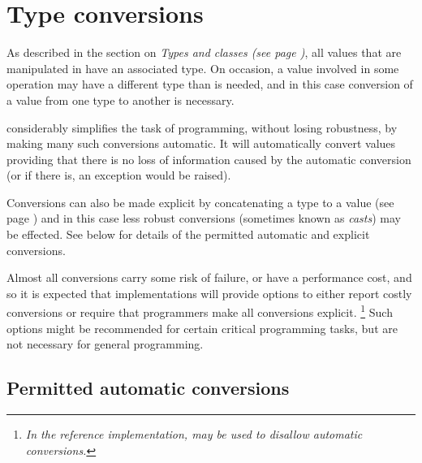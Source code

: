 \section{Type conversions}\label{refconv}
 
As described in the section on  \emph{Types and classes (see page \pageref{reftypes})}, all values that are manipulated in \nr{} have an
associated type.  On occasion, a value involved in some operation may
have a different type than is needed, and in this case conversion of
a value from one type to another is necessary.
 
\nr{} considerably simplifies the task of programming, without losing
robustness, by making many such conversions automatic.  It will
automatically convert values providing that there is no loss of
information caused by the automatic conversion (or if there is, an
exception would be raised).
 
\index{,}
Conversions can also be made explicit by concatenating
a type to a value  (see page \pageref{reftypeops}) and in this case less robust conversions
(sometimes known as \emph{casts}) may be effected.
See below for details of the permitted automatic and explicit
conversions.
 
Almost all conversions carry some risk of failure, or have a performance
cost, and so it is expected that implementations will provide options to
either report costly conversions or require that programmers make all
conversions explicit.
\footnote{
\emph{In the reference implementation,  may be
used to disallow automatic conversions.}
}
Such options might be recommended for certain critical programming
tasks, but are not necessary for general programming.
\subsection{Permitted automatic conversions}
 
